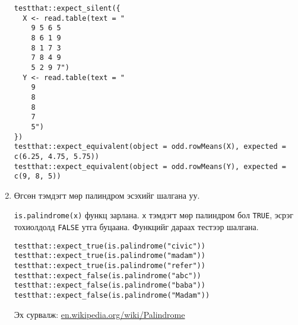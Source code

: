 \documentclass[11pt]{letter}
\begin{document}
\begin{enumerate}
\begin{lstlisting}[keywords={c},otherkeywords={odd.rowMeans,read.table,expect_silent,expect_equivalent}]
testthat::expect_silent({
  X <- read.table(text = "
    9 5 6 5
    8 6 1 9
    8 1 7 3
    7 8 4 9
    5 2 9 7")
  Y <- read.table(text = "
    9
    8
    8
    7
    5")
})
testthat::expect_equivalent(object = odd.rowMeans(X), expected = c(6.25, 4.75, 5.75))
testthat::expect_equivalent(object = odd.rowMeans(Y), expected = c(9, 8, 5))
\end{lstlisting}
\item Өгсөн тэмдэгт мөр палиндром эсэхийг шалгана уу.
\par
\lstinline[otherkeywords={is.palindrome}]|is.palindrome(x)| функц зарлана. \lstinline|x| тэмдэгт мөр палиндром бол \lstinline|TRUE|, эсрэг тохиолдолд \lstinline|FALSE| утга буцаана. Функцийг дараах тестээр шалгана.
\begin{lstlisting}[otherkeywords={is.palindrome,expect_true,expect_false}]
testthat::expect_true(is.palindrome("civic"))
testthat::expect_true(is.palindrome("madam"))
testthat::expect_true(is.palindrome("refer"))
testthat::expect_false(is.palindrome("abc"))
testthat::expect_false(is.palindrome("baba"))
testthat::expect_false(is.palindrome("Madam"))
\end{lstlisting}
Эх сурвалж: \href{https://en.wikipedia.org/wiki/Palindrome}{en.wikipedia.org/wiki/Palindrome}
\end{enumerate}
\end{document}
